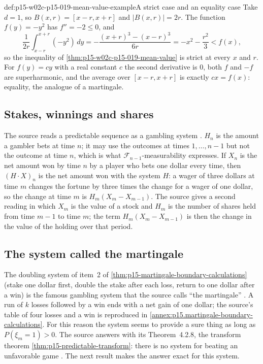 \begin{hbexample}{def:p15-w02c-p15-019-mean-value-example}{A strict case and an equality case}
Take \(d=1\), so \(B(x,r)=[x-r,x+r]\) and \(|B(x,r)|=2r\). The function
\(f(y)=-y^2\) has \(f''=-2\leq0\), and
\[
 \frac1{2r}\int_{x-r}^{x+r}(-y^2)\,dy
   =-\frac{(x+r)^3-(x-r)^3}{6r}
   =-x^2-\frac{r^2}3<f(x),
\]
so the inequality of \cref{thm:p15-w02c-p15-019-mean-value} is strict
at every \(x\) and \(r\). For \(f(y)=cy\) with a real constant \(c\) the
second derivative is \(0\), both \(f\) and \(-f\) are superharmonic, and
the average over \([x-r,x+r]\) is exactly \(cx=f(x)\): equality, the
analogue of a martingale.
\end{hbexample}

\subsection*{Stakes, winnings and shares}

The source reads a predictable sequence as a gambling system
\cite[p.~219]{DurrettPTEAuthor2019}. \(H_n\) is the amount a gambler
bets at time \(n\); it may use the outcomes at times
\(1,\ldots,n-1\) but not the outcome at time \(n\), which is what
\(\mathcal F_{n-1}\)-measurability expresses. If \(X_n\) is the net
amount won by time \(n\) by a player who bets one dollar every time,
then \((H\cdot X)_n\) is the net amount won with the system \(H\): a
wager of three dollars at time \(m\) changes the fortune by three times
the change for a wager of one dollar, so the change at time \(m\) is
\(H_m(X_m-X_{m-1})\). The source gives a second reading in which
\(X_m\) is the value of a stock and \(H_m\) is the number of shares held
from time \(m-1\) to time \(m\); the term \(H_m(X_m-X_{m-1})\) is then
the change in the value of the holding over that period.

\subsection*{The system called the martingale}

The doubling system of item~2 of
\cref{thm:p15-martingale-boundary-calculations} (stake one dollar first,
double the stake after each loss, return to one dollar after a win) is
the famous gambling system that the source calls ``the martingale''
\cite[pp.~219--220]{DurrettPTEAuthor2019}. A run of \(k\) losses
followed by a win ends with a net gain of one dollar; the source's table
of four losses and a win is reproduced in
\cref{annex:p15.martingale-boundary-calculations}. For this reason the
system seems to provide a sure thing as long as \(P(\xi_m=1)>0\). The
source answers with its Theorem~4.2.8, the transform theorem
\cref{thm:p15-predictable-transform}: there is no system for beating an
unfavorable game \cite[p.~220]{DurrettPTEAuthor2019}. The next result
makes the answer exact for this system.

